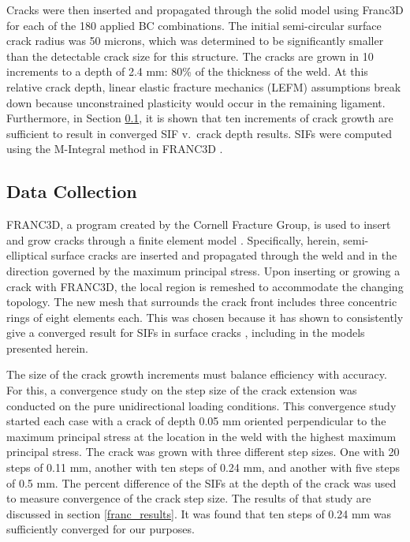 Cracks were then inserted and propagated through the solid model using Franc3D
\cite{carter2000automated} for each of the 180 applied BC combinations. The
initial semi-circular surface crack radius was 50 microns, which was determined
to be significantly smaller than the detectable crack size
\cite{christner1988nde} for this structure. The cracks are grown in 10
increments to a depth of 2.4 mm: 80\% of the thickness of the weld. At this
relative crack depth, linear elastic fracture mechanics (LEFM) assumptions break down because unconstrained plasticity would occur in the remaining ligament. Furthermore, in Section \ref{franc3d}, it is shown that ten increments
of crack growth are sufficient to result in converged SIF v.~crack depth
results.  SIFs were computed using the M-Integral method in FRANC3D
\cite{warzynek2005m}. 

\subsection{Data Collection} \label{franc3d}

FRANC3D, a program created by the Cornell Fracture Group, is used to insert and
grow cracks through a finite element model \cite{carter2000automated}.
Specifically, herein, semi-elliptical surface cracks are inserted and propagated
through the weld and in the direction governed by the maximum principal stress.
Upon inserting or growing a crack with FRANC3D, the local region is remeshed to
accommodate the changing topology.  The new mesh that surrounds the crack front
includes three concentric rings of eight elements each. This was chosen because it
has shown to consistently give a converged result for SIFs in surface cracks
\cite{raju1979stress}, including in the models presented herein.  

The size of the crack growth increments must balance efficiency with accuracy.
For this, a convergence study on the step size of the crack extension was conducted
on the pure unidirectional loading conditions.  This convergence study started
each case with a crack of depth 0.05 mm oriented perpendicular to the maximum
principal stress at the location in the weld with the highest maximum principal
stress.  The crack was grown with three different step sizes. One with 20 steps of
0.11 mm, another with ten steps of 0.24 mm, and another with five steps of 0.5 mm.
The percent difference of the SIFs at the depth of the crack was used to
measure convergence of the crack step size. The results of that study are discussed in section \ref{franc_results}. It was found that ten steps of 0.24 mm was sufficiently converged for our purposes.

